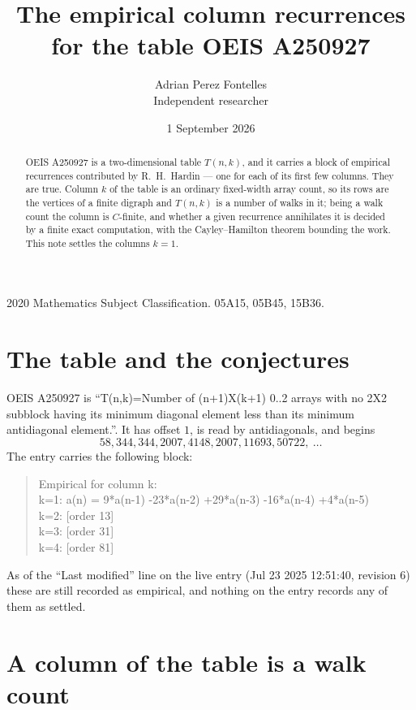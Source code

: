 \documentclass[11pt,a4paper]{article}
\title{The empirical column recurrences for the table OEIS A250927}
\author{Adrian Perez Fontelles\\ \small Independent researcher}
\date{1 September 2026}
\theoremstyle{plain}
\theoremstyle{definition}
\begin{document}
\maketitle

\begin{abstract}
OEIS A250927 is a two-dimensional table $T(n,k)$, and it carries a block of empirical
recurrences contributed by R.~H.~Hardin --- one for each of its first few columns. They are
true. Column $k$ of the table is an ordinary fixed-width array count, so its rows are the
vertices of a finite digraph and $T(n,k)$ is a number of walks in it; being a walk count the
column is $C$-finite, and whether a given recurrence annihilates it is decided by a finite
exact computation, with the Cayley--Hamilton theorem bounding the work. This note settles the columns $k=1$.
\end{abstract}

\noindent\small 2020 Mathematics Subject Classification. 05A15, 05B45, 15B36.\normalsize

\section{The table and the conjectures}

OEIS A250927 is ``T(n,k)=Number of (n+1)X(k+1) 0..2 arrays with no 2X2 subblock having its minimum diagonal element less than its minimum antidiagonal element.''. It has offset $1$, is
read by antidiagonals, and begins
\[
58, 344, 344, 2007, 4148, 2007, 11693, 50722,\ \dots
\]
The entry carries the following block:
\begin{quote}\small
Empirical for column k:\\
k=1: a(n) = 9*a(n-1) -23*a(n-2) +29*a(n-3) -16*a(n-4) +4*a(n-5)\\
k=2: [order 13]\\
k=3: [order 31]\\
k=4: [order 81]\\
\end{quote}
As of the ``Last modified'' line on the live entry (Jul 23 2025 12:51:40, revision 6) these are still
recorded as empirical, and nothing on the entry records any of them as settled.

\section{A column of the table is a walk count}
\end{document}
